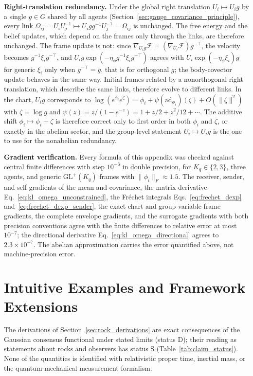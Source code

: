 \textbf{Right-translation redundancy.} Under the global right translation $U_i \mapsto U_i g$ by a single $g \in G$ shared by all agents (Section~\ref{sec:gauge_covariance_principle}), every link $\Omega_{ij} = U_iU_j^{-1} \mapsto U_i g g^{-1} U_j^{-1} = \Omega_{ij}$ is unchanged. The free energy and the belief updates, which depend on the frames only through the links, are therefore unchanged. The frame update is not: since $\nabla_{U_ig}\mathcal{F} = (\nabla_{U_i}\mathcal{F})g^{-\top}$, the velocity becomes $g^{-1}\xi_i g^{-\top}$, and $U_ig\exp(-\eta_\phi g^{-1}\xi_ig^{-\top})$ agrees with $U_i\exp(-\eta_\phi\xi_i)g$ for generic $\xi_i$ only when $g^{-\top} = g$, that is for orthogonal $g$; the body-covector update behaves in the same way. Initial frames related by a nonorthogonal right translation, which describe the same links, therefore evolve to different links. In the chart, $U_ig$ corresponds to $\log(e^{\phi_i}e^{\zeta}) = \phi_i + \psi(\mathrm{ad}_{\phi_i})(\zeta) + O(\|\zeta\|^2)$ with $\zeta = \log g$ and $\psi(z) = z/(1 - e^{-z}) = 1 + z/2 + z^2/12 + \cdots$. The additive shift $\phi_i \mapsto \phi_i + \zeta$ is therefore correct only to first order in both $\phi_i$ and $\zeta$, or exactly in the abelian sector, and the group-level statement $U_i \mapsto U_i g$ is the one to use for the nonabelian redundancy.

\textbf{Gradient verification.} Every formula of this appendix was checked against central finite differences with step $10^{-6}$ in double precision, for $K_q \in \{2, 3\}$, three agents, and generic $\mathrm{GL}^+(K_q)$ frames with $\|\phi_i\|_F \approx 1.5$. The receiver, sender, and self gradients of the mean and covariance, the matrix derivative Eq.~\eqref{eq:kl_omega_unconstrained}, the Fr\'echet integrals Eqs.~\eqref{eq:frechet_dexp} and~\eqref{eq:frechet_dexp_sender}, the exact chart and group-variable frame gradients, the complete envelope gradients, and the surrogate gradients with both precision conventions agree with the finite differences to relative error at most $10^{-7}$; the directional derivative Eq.~\eqref{eq:kl_omega_directional} agrees to $2.3 \times 10^{-7}$. The abelian approximation carries the error quantified above, not machine-precision error.

\section{Intuitive Examples and Framework Extensions}
\label{app:examples}

The derivations of Section~\ref{sec:rock_derivations} are exact consequences of the Gaussian consensus functional under stated limits (status D); their reading as statements about rocks and observers has status S (Table~\ref{tab:claim_status}). None of the quantities is identified with relativistic proper time, inertial mass, or the quantum-mechanical measurement formalism.

